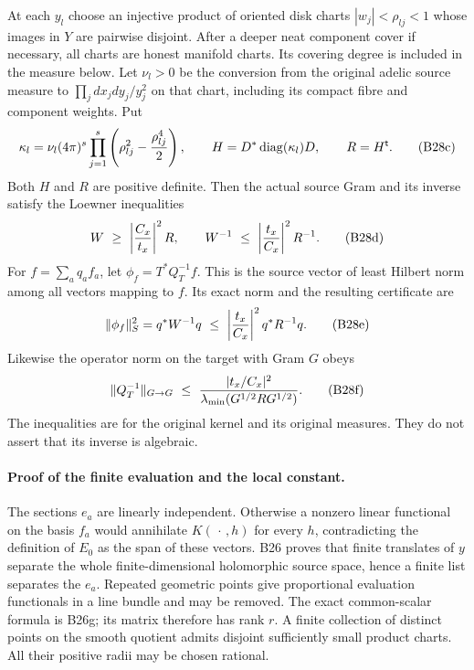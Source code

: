 At each $y_l$ choose an injective product of oriented disk
charts $|w_j|<\rho_{lj}<1$ whose images in $Y$ are pairwise
disjoint.  After a deeper neat component cover if necessary,
all charts are honest manifold charts.  Its covering degree
is included in the measure below.  Let $\nu_l>0$ be the
conversion from the original adelic source measure to
$\prod_j dx_jdy_j/y_j^2$ on that chart, including its compact
fibre and component weights.  Put
\[
 \kappa_l=\nu_l(4\pi)^s
           \prod_{j=1}^s\left(\rho_{lj}^2-
                                      {\rho_{lj}^4\over2}\right),
 \qquad H=D^*\operatorname{diag}(\kappa_l)D,
 \qquad R=H^{\mathsf t}.
 \tag{B28c}
\]
Both $H$ and $R$ are positive definite.  Then the actual
source Gram and its inverse satisfy the Loewner inequalities
\[
    W\ \geq\ \left|{C_x\over t_x}\right|^2R,
    \qquad
    W^{-1}\ \leq\ \left|{t_x\over C_x}\right|^2R^{-1}.
 \tag{B28d}
\]
For $f=\sum_a q_af_a$, let
$\phi_f=T^*Q_T^{-1}f$.  This is the source vector of least
Hilbert norm among all vectors mapping to $f$.  Its exact
norm and the resulting certificate are
\[
 \|\phi_f\|_S^2=q^*W^{-1}q
       \ \leq\ \left|{t_x\over C_x}\right|^2q^*R^{-1}q.
 \tag{B28e}
\]
Likewise the operator norm on the target with Gram $G$ obeys
\[
 \|Q_T^{-1}\|_{G\to G}\ \leq\
 { |t_x/C_x|^2\over
           \lambda_{\min}(G^{1/2}RG^{1/2})}.
 \tag{B28f}
\]
The inequalities are for the original kernel and its original
measures.  They do not assert that its inverse is algebraic.

\paragraph{Proof of the finite evaluation and the local constant.}
The sections $e_a$ are linearly independent.  Otherwise a
nonzero linear functional on the basis $f_a$ would annihilate
$K(\,\cdot\,,h)$ for every $h$, contradicting the definition
of $E_0$ as the span of these vectors.  B26 proves that finite
translates of $y$ separate the whole finite-dimensional
holomorphic source space, hence a finite list separates the
$e_a$.  Repeated geometric points give proportional evaluation
functionals in a line bundle and may be removed.  The exact
common-scalar formula is B26g; its matrix therefore has rank
$r$.  A finite collection of distinct points on the smooth
quotient admits disjoint sufficiently small product charts.
All their positive radii may be chosen rational.

